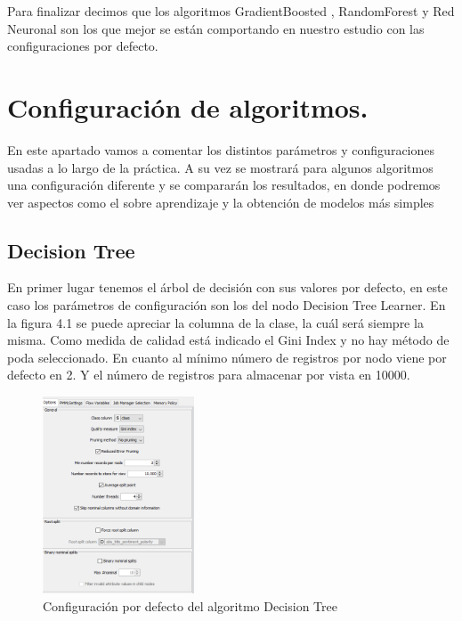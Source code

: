 	Para finalizar decimos que los algoritmos GradientBoosted , RandomForest y Red Neuronal son los que mejor se están comportando en nuestro estudio con las configuraciones 
	por defecto. 
	
	\section[Configuración de algoritmos]{Configuración de algoritmos.}
	
	En este apartado vamos a comentar los distintos parámetros y configuraciones usadas a lo largo de la práctica. A su vez se mostrará para algunos algoritmos una configuración diferente y se compararán los resultados, en donde podremos ver aspectos como el sobre aprendizaje y la obtención de modelos más simples
	
	
	\subsection{Decision Tree}
	
	En primer lugar tenemos el árbol de decisión con sus valores por defecto, en este caso los parámetros de configuración son los del nodo Decision Tree Learner. En la figura 4.1 se puede apreciar la columna de la clase, la cuál será siempre la misma. Como medida de calidad está indicado el Gini Index y no hay método de poda seleccionado.
	En cuanto al mínimo número de registros por nodo viene por defecto en 2. Y el número de registros para almacenar por vista en 10000.	\\
	
	\begin{figure}[htb]
		\centering
		\includegraphics[width=0.4\textwidth]{./imagenes/40}
		\caption{Configuración por defecto del algoritmo Decision Tree} \label{fig:1}
	\end{figure}
	
